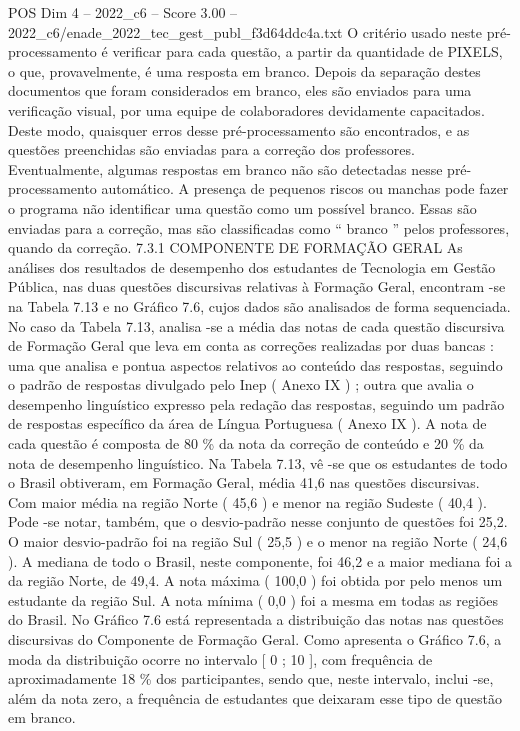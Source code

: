 \begin{textsample}{POS Dim 4 – 2022\_c6 – Score 3.00 – 2022\_c6/enade\_2022\_tec\_gest\_publ\_f3d64ddc4a.txt}
O critério usado neste pré-processamento é verificar para cada questão, a partir da quantidade de PIXELS, o que, provavelmente, é uma resposta em branco.
Depois da separação destes documentos que foram considerados em branco, eles são enviados para uma verificação visual, por uma equipe de colaboradores devidamente capacitados.
Deste modo, quaisquer erros desse pré-processamento são encontrados, e as questões preenchidas são enviadas para a correção dos professores.
Eventualmente, algumas respostas em branco não são detectadas nesse pré-processamento automático.
A presença de pequenos riscos ou manchas pode fazer o programa não identificar uma questão como um possível branco.
Essas são enviadas para a correção, mas são classificadas como “ branco ” pelos professores, quando da correção. 7.3.1 COMPONENTE DE FORMAÇÃO GERAL As análises dos resultados de desempenho dos estudantes de Tecnologia em Gestão Pública, nas duas questões discursivas relativas à Formação Geral, encontram -se na Tabela 7.13 e no Gráfico 7.6, cujos dados são analisados de forma sequenciada.
No caso da Tabela 7.13, analisa -se a média das notas de cada questão discursiva de Formação Geral que leva em conta as correções realizadas por duas bancas : uma que analisa e pontua aspectos relativos ao conteúdo das respostas, seguindo o padrão de respostas divulgado pelo Inep ( Anexo IX ) ; outra que avalia o desempenho linguístico expresso pela redação das respostas, seguindo um padrão de respostas específico da área de Língua Portuguesa ( Anexo IX ).
A nota de cada questão é composta de 80 \% da nota da correção de conteúdo e 20 \% da nota de desempenho linguístico.
Na Tabela 7.13, vê -se que os estudantes de todo o Brasil obtiveram, em Formação Geral, média 41,6 nas questões discursivas.
Com maior média na região Norte ( 45,6 ) e menor na região Sudeste ( 40,4 ).
Pode -se notar, também, que o desvio-padrão nesse conjunto de questões foi 25,2.
O maior desvio-padrão foi na região Sul ( 25,5 ) e o menor na região Norte ( 24,6 ).
A mediana de todo o Brasil, neste componente, foi 46,2 e a maior mediana foi a da região Norte, de 49,4.
A nota máxima ( 100,0 ) foi obtida por pelo menos um estudante da região Sul.
A nota mínima ( 0,0 ) foi a mesma em todas as regiões do Brasil.
No Gráfico 7.6 está representada a distribuição das notas nas questões discursivas do Componente de Formação Geral.
Como apresenta o Gráfico 7.6, a moda da distribuição ocorre no intervalo [ 0 ; 10 ], com frequência de aproximadamente 18 \% dos participantes, sendo que, neste intervalo, inclui -se, além da nota zero, a frequência de estudantes que deixaram esse tipo de questão em branco.

\end{textsample}
